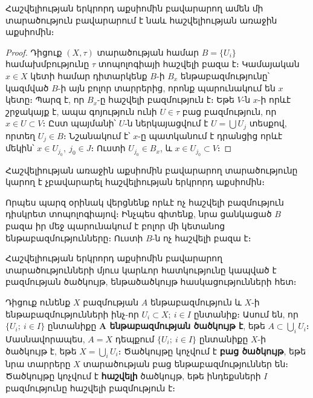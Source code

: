 \documentclass[./main.tex]{subfiles}
\begin{document}
\begin{theorem}\label{ch8thm2}
\label{thm:8.2} 
Հաշվելիության երկրորդ աքսիոմին բավարարող ամեն մի տարածու\-թյուն բավարարում է նաև հաշվելիության առաջին աքսիոմին։
\end{theorem}
\begin{proof}
Դիցուք $(X, \tau)$ տարածության համար $B=\{U_i\}$ %
համախմբությու\-նը $\tau$ տոպոլոգիայի հաշվելի բազա է։ Կամայական $x \in X$ կետի համար դիտարկենք $B$-ի %
$B_x$ ենթաբազմությունը՝ կազմված $B$-ի այն բոլոր տարրերից, որոնք պարու\-նա\-կում են $x$ կետը։ 
Պարզ է, որ $B_x$-ը հաշվելի բազմություն է։ Եթե $V$-ն $x$-ի որևէ շրջակայք է, ապա գոյություն ունի $U \in \tau$ բաց բազմություն, որ $x \in U \subset V$։ Ըստ պայմանի՝ $U$-ն ներկայացվում է $U=\bigcup U_j$ տեսքով, որտեղ $U_j \in B$։ Նշանակում է՝ $x$-ը պատկանում է դրանցից որևէ մեկին՝ $x \in U_{j_0},\ j_0 \in J$։ Ուստի $U_{j_0} \in B_x$, և $x \in U_{j_0} \subset V$։
\end{proof}
\par Հաշվելիության առաջին աքսիոմին բավարարող տարածությունը կարող է չբա\-վա\-րա\-րել հաշվելիության երկրորդ աքսիոմին։
\par Որպես պարզ օրինակ վերցնենք որևէ ոչ հաշվելի բազմություն դիսկրետ տոպո\-լոգիա\-յով։ Ինչպես գիտենք, նրա ցանկացած $B$  բազա իր մեջ պարունակում է բոլոր մի կետանոց ենթաբազմությունները։ Ուստի $B$-ն ոչ հաշվելի բազա է։

\par Հաշվելիության երկրորդ աքսիոմին բավարարող տարածությունների մյուս \linebreak կարևոր հատկությունը կապված է բազմության ծածկույթ, ենթածածկույթ հաս\-կա\-ցու\-թյուն\-նե\-րի հետ։

\begin{definition}
Դիցուք ունենք $X$ բազմության $A$ ենթաբազմություն և $X$-ի ենթա\-բազ\-մու\-թյունների ինչ-որ $U_i \subset X;\ i \in I$ ընտանիք։ Ասում են, որ $\{ U_i;\ i \in I \}$ ընտանիքը \textbf{$\boldsymbol{A}$ ենթա\-բազ\-մու\-թյան ծածկույթ է}, եթե $A \subset \bigcup\limits_iU_i$։ Մասնավորապես, ${A=X}$ դեպքում $\{U_i;\ i \in I\}$ ընտանիքը $X$-ի ծածկույթ է, եթե $X=\bigcup\limits_i U_i$։ Ծածկույթը կոչվում է \textbf{բաց ծածկույթ}, եթե նրա տարրերը $X$ տարածության բաց ենթա\-բազ\-մու\-թյուն\-ներ են։ Ծածկույթը կոչվում է \textbf{հաշվելի} ծածկույթ, եթե ինդեքսների $I$ բազ\-մու\-թյու\-նը հաշվելի բազմություն է։ 
\end{definition}
\end{document}
